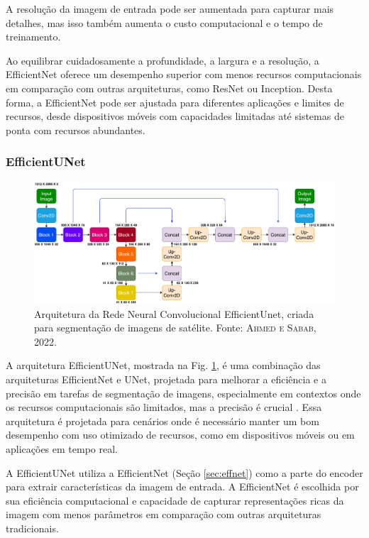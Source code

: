 \documentclass[a4,12pt]{horizon-theme}
\begin{document}
A resolução da imagem de entrada pode ser aumentada para capturar mais detalhes, mas isso também aumenta o custo computacional e o tempo de treinamento.

Ao equilibrar cuidadosamente a profundidade, a largura e a resolução, a EfficientNet oferece um desempenho superior com menos recursos computacionais em comparação com outras arquiteturas, como ResNet ou Inception. Desta forma, a EfficientNet pode ser ajustada para diferentes aplicações e limites de recursos, desde dispositivos móveis com capacidades limitadas até sistemas de ponta com recursos abundantes.


\subsubsection{EfficientUNet}
\label{sec:effunet}
\begin{figure}[!ht]
  \includegraphics[width=\textwidth]{figures/EfficientUnet.png}
  \caption{Arquitetura da Rede Neural Convolucional EfficientUnet, criada para segmentação de imagens de satélite. Fonte: \textsc{Ahmed e Sabab, 2022}.}
  \label{fig:effunet}
\end{figure}

A arquitetura EfficientUNet, mostrada na Fig. \ref{fig:effunet}, é uma combinação das arquiteturas EfficientNet e UNet, projetada para melhorar a eficiência e a precisão em tarefas de segmentação de imagens, especialmente em contextos onde os recursos computacionais são limitados, mas a precisão é crucial \citep{effunet}. Essa arquitetura é projetada para cenários onde é necessário manter um bom desempenho com uso otimizado de recursos, como em dispositivos móveis ou em aplicações em tempo real.

A EfficientUNet utiliza a EfficientNet (Seção \ref{sec:effnet}) como a parte do encoder para extrair características da imagem de entrada. A EfficientNet é escolhida por sua eficiência computacional e capacidade de capturar representações ricas da imagem com menos parâmetros em comparação com outras arquiteturas tradicionais.
\end{document}
